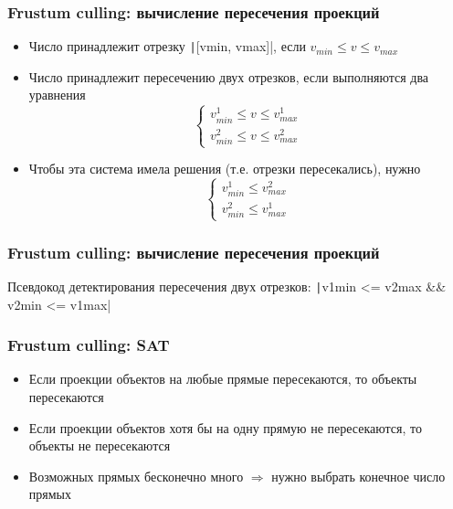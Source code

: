 \documentclass{beamer}
\begin{document}
\begin{frame}[fragile]
\fontsize{10pt}{10pt}
\frametitle{Frustum culling: вычисление пересечения проекций}
\begin{itemize}
\item Число принадлежит отрезку \texttt|[vmin, vmax]|, если \begin{math}v_{min} \leq v \leq v_{max}\end{math}
\pause
\item Число принадлежит пересечению двух отрезков, если выполняются два уравнения
\begin{equation}
\begin{cases}
v^1_{min} \leq v \leq v^1_{max} \\
v^2_{min} \leq v \leq v^2_{max}
\end{cases}
\end{equation}
\pause
\item Чтобы эта система имела решения (т.е. отрезки пересекались), нужно
\begin{equation}
\begin{cases}
v^1_{min} \leq v^2_{max} \\
v^2_{min} \leq v^1_{max}
\end{cases}
\end{equation}
\end{itemize}
\end{frame}

\begin{frame}[fragile]
\fontsize{10pt}{10pt}
\frametitle{Frustum culling: вычисление пересечения проекций}
Псевдокод детектирования пересечения двух отрезков:
\texttt|v1min <= v2max && v2min <= v1max|
\end{frame}

\begin{frame}[fragile]
\frametitle{Frustum culling: SAT}
\begin{itemize}
\item Если проекции объектов на любые прямые пересекаются, то объекты пересекаются
\pause
\item Если проекции объектов хотя бы на одну прямую не пересекаются, то объекты не пересекаются
\pause
\item Возможных прямых бесконечно много \begin{math}\Longrightarrow\end{math} нужно выбрать конечное число прямых
\end{itemize}
\end{frame}
\end{document}
